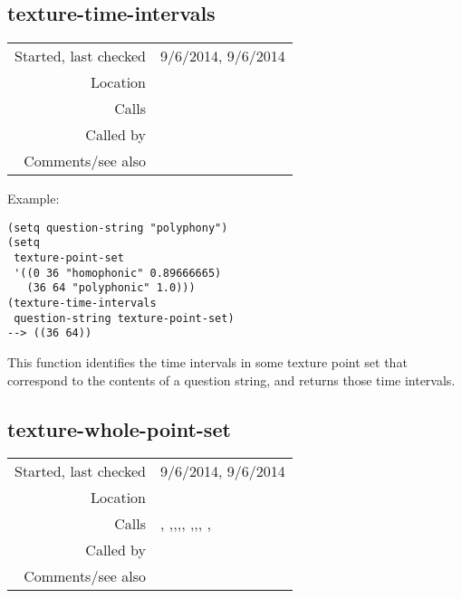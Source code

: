 \subsection*{texture-time-intervals}\label{fun:texture-time-intervals}

\vspace{0.3cm}
\begin{tabular}{r|p{8cm}}
Started, last checked & 9/6/2014, 9/6/2014 \\
Location & \nameref{sec:texture} \\
Calls & \\
Called by & \nameref{fun:Stravinsqi-Jun2014} \\
Comments/see also &
\end{tabular}

\vspace{0.5cm}
\noindent Example:
\begin{verbatim}
(setq question-string "polyphony")
(setq
 texture-point-set
 '((0 36 "homophonic" 0.89666665)
   (36 64 "polyphonic" 1.0)))
(texture-time-intervals
 question-string texture-point-set)
--> ((36 64))
\end{verbatim}

\noindent This function identifies the time intervals
in some texture point set that correspond to the
contents of a question string, and returns those time
intervals.


\subsection*{texture-whole-point-set}\label{fun:texture-whole-point-set}

\vspace{0.3cm}
\begin{tabular}{r|p{8cm}}
Started, last checked & 9/6/2014, 9/6/2014 \\
Location & \nameref{sec:texture} \\
Calls & \nameref{fun:add-to-nth}, \nameref{fun:constant-vector},\newline \nameref{fun:dataset-restricted-to-m-in-nth},\newline \nameref{fun:intersection-multidimensional},\newline \nameref{fun:max-item}, \nameref{fun:nth-list-of-lists},\newline \nameref{fun:orthogonal-projection-unique-equalp},\newline \nameref{fun:set-difference-multidimensional-sorted-asc}, \nameref{fun:sky-line-clipped}, \nameref{fun:test-all-true} \\
Called by & \nameref{fun:texture-from-kern} \\
Comments/see also &
\end{tabular}

